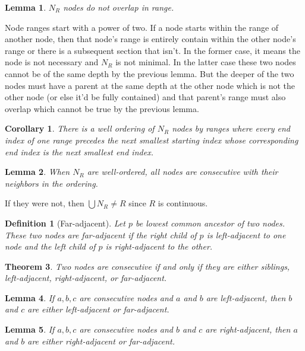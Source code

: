 \documentclass{article}
\newtheorem{definition}{Definition}[section]
\newtheorem{theorem}{Theorem}[section]
\newtheorem{corollary}{Corollary}[theorem]
\newtheorem{lemma}[theorem]{Lemma}
\begin{document}
\begin{lemma}
  $N_R$ nodes do not overlap in range.
\end{lemma}
Node ranges start with a power of two. If a node starts within the range of
another node, then that node's range is entirely contain within the other node's
range or there is a subsequent section that isn't. In the
former case, it means the node is not necessary and $N_R$ is not minimal. In the
latter case these two nodes cannot be of the same depth by the previous
lemma. But the deeper of the two nodes must have a parent at the same depth at
the other node which is not the other node (or else it'd be fully contained) and
that parent's range must also overlap which cannot be true by the previous lemma.

\begin{corollary}
  There is a well ordering of $N_R$ nodes by ranges where every end index of one
  range precedes the next smallest starting index whose corresponding end index is
  the next smallest end index.
\end{corollary}

\begin{lemma}
  When $N_R$ are well-ordered, all nodes are consecutive with their neighbors in the ordering.
\end{lemma}
If they were not, then $\bigcup N_R \neq R$ since $R$ is continuous.

\begin{definition}[Far-adjacent]
  Let $p$ be lowest common ancestor of two nodes. These two nodes are
  far-adjacent if the right child of $p$ is
  left-adjacent to one node and the left child of
  $p$ is right-adjacent to the other.
\end{definition}

\begin{theorem}
  Two nodes are consecutive if and only if they are either siblings,
  left-adjacent, right-adjacent, or far-adjacent.
\end{theorem}

\begin{lemma}
  If $a, b, c$ are consecutive nodes and $a$ and $b$ are left-adjacent, then $b$
  and $c$ are either left-adjacent or far-adjacent.
\end{lemma}

\begin{lemma}
  If $a, b, c$ are consecutive nodes and $b$ and $c$ are right-adjacent, then
  $a$ and $b$ are either right-adjacent or far-adjacent.
\end{lemma}
\end{document}
